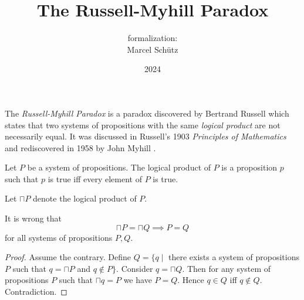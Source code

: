 \documentclass[english]{article}
\title{The Russell-Myhill Paradox}
\author{\Naproche formalization:\\[0.5em]Marcel Schütz}
\date{2024}
\begin{document}
  \maketitle

  \begin{forthel}
  \end{forthel}

  \noindent The \emph{Russell-Myhill Paradox} is a paradox discovered by 
  Bertrand Russell which states that two systems of propositions with the same 
  \emph{logical product} are not necessarily equal.
  It was discussed in Russell's 1903 \emph{Principles of Mathematics}
  \cite[Appendix B]{Russell1903} and rediscovered in 1958 by John Myhill
  \cite{Myhill1958}.

  \begin{forthel}
    \begin{signature*}
      Let $P$ be a system of propositions.
      The logical product of $P$ is a proposition $p$ such that $p$ is true iff every element of $P$ is true.
    \end{signature*}
    
    Let $\sqcap P$ denote the logical product of $P$.
    
    \begin{theorem*}\label{russell_myhill_paradox}
      It is wrong that
      \[ \sqcap P = \sqcap Q \implies P = Q \]
      for all systems of propositions $P, Q$.
    \end{theorem*}
    \begin{proof}
      Assume the contrary.
      Define $Q = \{q \mid$ there exists a system of propositions $P$ such that $q = \sqcap P$ and $q \notin P\}$.
      Consider $q = \sqcap Q$.
      Then for any system of propositions $P$ such that $\sqcap q = P$ we have $P = Q$.
      Hence $q \in Q$ iff $q \notin Q$.
      Contradiction.
    \end{proof}
  \end{forthel}

  \printbibliography
\end{document}
